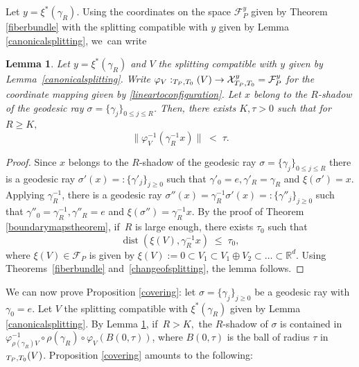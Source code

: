 \documentclass[10pt]{amsart}
\newcommand{\NoChangel}[1]{%
\expandafter\let\csname old\string#1\endcsname=#1
\let#1=\relax
\newcommand{#1}{\mathop{\mathcode`l="716C\csname old\string#1\endcsname\mathcode`l="7160}\displaylimits}%
}
\newtheorem{lemma}[theorem]{Lemma}
\newcommand{\R}{\mathbb{R}}
\newcommand{\F}{\mathcal{F}}
\newcommand{\X}{\mathcal{X}}
\let\g\gamma
\let\s\sigma
\DeclareMathOperator{\dist}{dist}
\DeclareMathOperator{\nil}{Nil}\NoChangel{\nil}
\begin{document}
Let \(y =\xi^\ast (\g_R) \). Using the coordinates on the space \(\F_P^y\) given by Theorem \ref{fiberbundle} with the splitting compatible with \(y\) given by Lemma \ref{canonicalsplitting}, we~can write
\begin{lemma}\label{angle} Let \(y =\xi^\ast (\g_R) \) and \(V\) the splitting compatible with \(y\) given by Lemma~\ref{canonicalsplitting}. Write \(\varphi_V: \nil_{T_P,T_0}(V) \to \X_{T_P,T_0}^{y} = \F_P^y\) for the coordinate mapping given by \eqref{lineartoconfiguration}. Let \(x \) belong to the \(R\)-shadow of the geodesic ray \(\s =\{ \g_j \}_{0\leq j \leq R} \). Then, there exists \(K, \tau >0\) such that for \(R \geq K, \) \begin{equation*} \| \varphi_V^{-1} (\g_R^{-1}x) \|\; < \; \tau. \end{equation*} \end{lemma}
\begin{proof} Since \(x \) belongs to the \(R\)-shadow of the geodesic ray \(\s =\{ \g_j \}_{0\leq j \leq R} \) there is a geodesic ray \(\s' (x)=:\{ \g'_j \}_{j \geq 0} \) such that \(\g'_0= e, \g'_R = \g_R\) and \(\xi (\s') = x\). Applying \(\g_R^{-1}\), there is a geodesic ray \(\s''(x) =\g_R^{-1} \s'(x) =: \{ \g''_j \}_{j \geq 0} \) such that \(\g''_0 = \g_R^{-1}, \g''_R = e\) and \(\xi (\s'') = \g_R^{-1} x\). By the proof of Theorem \ref{boundarymapstheorem}, if~\(R\) is large enough, there exists \(\tau_0\) such that
\[
 \dist (\xi (V), \g_R^{-1} x) \; \le \;\tau_0,
\]
where \(\xi (V) \in \F_P \) is given by \(\xi (V) := {0} \subset V_1 \subset V_1 \oplus V_2 \subset \ldots \subset \R^d \). Using Theorems~\ref{fiberbundle} and~\ref{changeofsplitting}, the lemma follows. \end{proof}

We can now prove Proposition \ref{covering}: let \(\s =\{ \g_j \}_{j \geq 0} \) be a geodesic ray with \(\g_0 = e\). Let \(V\) the splitting compatible with \(\xi^\ast (\g_R) \) given by Lemma \ref{canonicalsplitting}. By Lemma \ref{angle}, if~\(R >K, \) the \(R \)-shadow of \(\s\) is contained in \(\varphi_{\rho(\g_R) V}^{-1}\circ \rho(\g_R) \circ \varphi_V (B(0, \tau))\), where \(B(0, \tau) \) is the ball of radius \(\tau \) in \(\nil_{T_P,T_0}(V)\). Proposition \ref{covering} amounts to the following:
\end{document}
